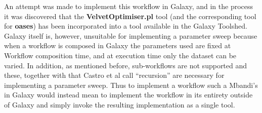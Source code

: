 \documentclass[a4paper,10pt]{scrreprt}
\begin{document}
An attempt was made to implement this workflow in Galaxy, and in the process it was discovered that the \textbf{VelvetOptimiser.pl} tool (and the corresponding tool for \textbf{oases}) has been incorporated into a tool available in the Galaxy Toolshed. Galaxy itself is, however, unsuitable for implementing a parameter sweep because when a workflow is composed in Galaxy the parameters used are fixed at Workflow composition time, and at execution time only the dataset can be varied. In addition, as mentioned before, sub-workflows are not supported and these, together with that Castro et al call ``recursion'' are necessary for implementing a parameter sweep. Thus to implement a workflow such a Mbandi's in Galaxy would instead mean to implement the workflow in its entirety outside of Galaxy and simply invoke the resulting implementation as a single tool.



%
%
%
%
%
%
%
\end{document}
